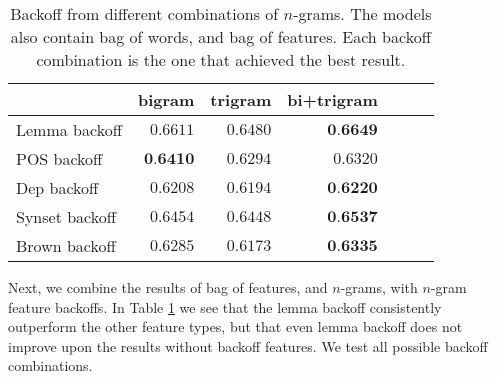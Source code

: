\documentclass[11pt,letterpaper]{article}
\begin{document}
\begin{table}
  \begin{smaller}    
  \begin{center}
    \begin{tabular}{lrrrrrr}
      \toprule
      & bigram & trigram & bi+trigram \\
      \midrule
      Lemma backoff & $0.6611$ & $0.6480$ &  $\textbf{0.6649}$ \\ 
      POS backoff & $\textbf{0.6410}$ & $0.6294$ & $0.6320$ \\
      Dep backoff & $0.6208$ & $0.6194$ & $\textbf{0.6220}$ \\
      Synset backoff & $0.6454$ & $0.6448$ &  $\textbf{0.6537}$\\
      Brown backoff & $0.6285$ &  $0.6173$  & $\textbf{0.6335}$\\
      
      
      \bottomrule

    \end{tabular}
  \end{center}
  \caption{Backoff from different combinations of $n$-grams. The models also contain bag of words, and bag of features. Each backoff combination is the one that achieved the best result.}
  \label{tab:ngrambackoff}
  \end{smaller}
\end{table}

Next, we combine the results of bag of features, and $n$-grams, with $n$-gram feature backoffs. In Table \ref{tab:ngrambackoff} we see that the lemma backoff consistently outperform the other feature types, but that even lemma backoff does not improve upon the results without backoff features. We test all possible backoff combinations.
\end{document}
